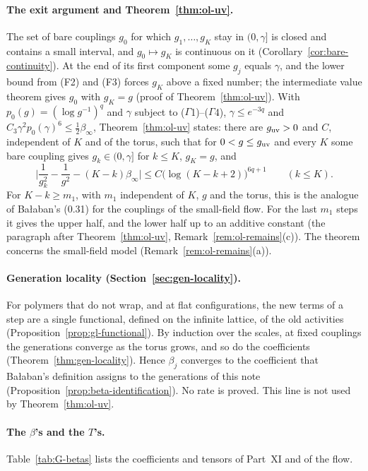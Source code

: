 \paragraph{The exit argument and Theorem~\ref{thm:ol-uv}.} The set of bare couplings $g_0$ for which $g_1,\dots,g_K$ stay in $(0,\gamma]$ is closed and contains a small interval, and $g_0\mapsto g_K$ is continuous on it (Corollary~\ref{cor:bare-continuity}). At the end of its first component some $g_j$ equals $\gamma$, and the lower bound from (F2) and (F3) forces $g_K$ above a fixed number; the intermediate value theorem gives $g_0$ with $g_K=g$ (proof of Theorem~\ref{thm:ol-uv}). With $p_0(g)=(\log g^{-1})^q$ and $\gamma$ subject to ($\Gamma$1)--($\Gamma$4), $\gamma\le e^{-3q}$ and $C_3\gamma^2p_0(\gamma)^6\le\frac12\beta_\infty$, Theorem~\ref{thm:ol-uv} states: there are $g_{\rm uv}>0$ and $C$, independent of $K$ and of the torus, such that for $0<g\le g_{\rm uv}$ and every $K$ some bare coupling gives $g_k\in(0,\gamma]$ for $k\le K$, $g_K=g$, and
\[
\Big|\frac1{g_k^2}-\frac1{g^2}-(K-k)\beta_\infty\Big|\le C\big(\log(K-k+2)\big)^{6q+1}\qquad(k\le K).
\]
For $K-k\ge m_1$, with $m_1$ independent of $K$, $g$ and the torus, this is the analogue of Ba\l aban's (0.31) for the couplings of the small-field flow. For the last $m_1$ steps it gives the upper half, and the lower half up to an additive constant (the paragraph after Theorem~\ref{thm:ol-uv}, Remark~\ref{rem:ol-remains}(c)). The theorem concerns the small-field model (Remark~\ref{rem:ol-remains}(a)).

\paragraph{Generation locality (Section~\ref{sec:gen-locality}).} For polymers that do not wrap, and at flat configurations, the new terms of a step are a single functional, defined on the infinite lattice, of the old activities (Proposition~\ref{prop:gl-functional}). By induction over the scales, at fixed couplings the generations converge as the torus grows, and so do the coefficients (Theorem~\ref{thm:gen-locality}). Hence $\beta_j$ converges to the coefficient that Ba\l aban's definition \cite[(1.20)--(1.22)]{BalYM4I} assigns to the generations of this note (Proposition~\ref{prop:beta-identification}). No rate is proved. This line is not used by Theorem~\ref{thm:ol-uv}.

\paragraph{The $\beta$'s and the $T$'s.} Table~\ref{tab:G-betas} lists the coefficients and tensors of Part~XI and of the flow.

